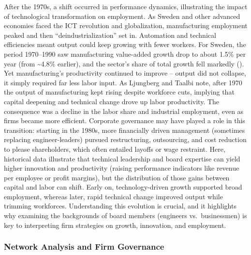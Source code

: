 \documentclass[
]{article}
\begin{document}
After the 1970s, a shift occurred in performance dynamics, illustrating
the impact of technological transformation on employment. As Sweden and
other advanced economies faced the ICT revolution and globalization,
manufacturing employment peaked and then ``deindustrialization'' set
in\hspace{0pt}. Automation and technical efficiencies meant output could
keep growing with fewer workers. For Sweden, the period 1970--1990 saw
manufacturing value-added growth drop to about 1.5\% per year (from
\textasciitilde4.8\% earlier), and the sector's share of total growth
fell markedly (). Yet manufacturing's productivity continued to improve
-- output did not collapse, it simply required far less labor input. As
Ljungberg and Taalbi note, after 1970 the output of manufacturing kept
rising despite workforce cuts, implying that capital deepening and
technical change drove up labor productivity\hspace{0pt}. The
consequence was a decline in the labor share and industrial employment,
even as firms became more efficient. Corporate governance may have
played a role in this transition: starting in the 1980s, more
financially driven management (sometimes replacing engineer-leaders)
pursued restructuring, outsourcing, and cost reduction to please
shareholders, which often entailed layoffs or wage restraint. Here,
historical data illustrate that technical leadership and board expertise
can yield higher innovation and productivity (raising performance
indicators like revenue per employee or profit margins), but the
distribution of those gains between capital and labor can shift. Early
on, technology-driven growth supported broad employment, whereas later,
rapid technical change improved output while trimming workforces.
Understanding this evolution is crucial, and it highlights why examining
the backgrounds of board members (engineers vs.~businessmen) is key to
interpreting firm strategies on growth, innovation, and employment.

\subsubsection{Network Analysis and Firm
Governance}\label{network-analysis-and-firm-governance}
\end{document}
